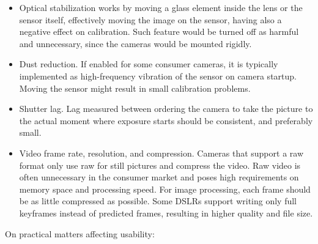 \begin{itemize}
	\item Optical stabilization works by moving a glass element inside the lens or the sensor itself, effectively moving the image on the sensor, having also a negative effect on calibration.
		Such feature would be turned off as harmful and unnecessary, since the cameras would be mounted rigidly.

	\item Dust reduction.
		If enabled for some consumer cameras, it is typically implemented as high-frequency vibration of the sensor on camera startup.
		Moving the sensor might result in small calibration problems.

	\item Shutter lag.
		Lag measured between ordering the camera to take the picture to the actual moment where exposure starts should be consistent, and preferably small.

	\item Video frame rate, resolution, and compression.
		Cameras that support a raw format only use raw for still pictures and compress the video.
		Raw video is often unnecessary in the consumer market and poses high requirements on memory space and processing speed.
		For image processing, each frame should be as little compressed as possible.
		Some DSLRs support writing only full keyframes instead of predicted frames, resulting in higher quality and file size.

\end{itemize}

On practical matters affecting usability:

